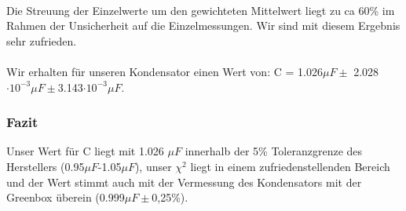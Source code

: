 \documentclass[12pt,a4paper]{article}
\begin{document}
\\Die Streuung der Einzelwerte um den gewichteten Mittelwert liegt zu ca 60\% im Rahmen der Unsicherheit auf die Einzelmessungen. Wir sind mit diesem Ergebnis sehr zufrieden.\\
\\Wir erhalten für unseren Kondensator einen Wert von: C = 1.026$\mu F \pm$ 2.028$\cdot 10^{-3}\mu F \pm$3.143$\cdot 10^{-3}\mu F$. 

\subsubsection{Fazit}
Unser Wert für C liegt mit 1.026 $\mu F$ innerhalb der 5\% Toleranzgrenze des Herstellers (0.95$\mu F$-1.05$\mu F$), unser $\chi^2$ liegt in einem zufriedenstellenden Bereich und der Wert stimmt auch mit der Vermessung des Kondensators mit der Greenbox überein (0.999$\mu F \pm$0,25\%).\\
\end{document}
